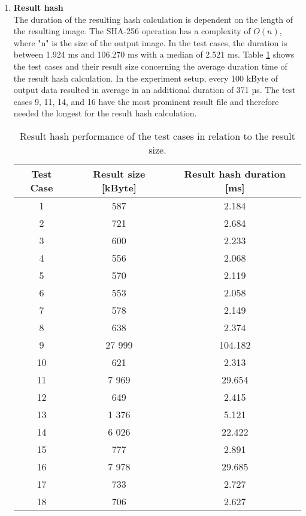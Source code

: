 \documentclass[draft,final]{vutinfth} %
\begin{document}
\begin{enumerate}
	\item \textbf{Result hash} \\
	The duration of the resulting hash calculation is dependent on the length of the resulting image. The SHA-256 operation has a complexity of $O(n)$, where "n" is the size of the output image. In the test cases, the duration is between 1.924 ms and 106.270 ms with a median of 2.521 ms. Table \ref{Tab:result_hash} shows the test cases and their result size concerning the average duration time of the result hash calculation. In the experiment setup, every 100 kByte of output data resulted in average in an additional duration of 371 µs. The test cases 9, 11, 14, and 16 have the most prominent result file and therefore needed the longest for the result hash calculation.     
	
	\begin{table}[]
		\centering
		\caption{Result hash performance of the test cases in relation to the result size.}
		\begin{tabular}{c|c|c}
			\textbf{Test Case} & \textbf{Result size [kByte]} & \textbf{Result hash duration [ms]}  \\ \hline
			1 & 587  & 2.184 \\ \hline 
			2 & 721 & 2.684 \\ \hline
			3 & 600 & 2.233 \\ \hline
			4 & 556 & 2.068 \\ \hline
			5 & 570 & 2.119 \\ \hline
			6 & 553 & 2.058 \\ \hline
			7 & 578 & 2.149 \\ \hline
			8 & 638 & 2.374 \\ \hline
			9 & 27 999 & 104.182 \\ \hline
			10 & 621 & 2.313 \\ \hline
			11 & 7 969 & 29.654 \\ \hline
			12 & 649 & 2.415 \\ \hline
			13 & 1 376 & 5.121 \\ \hline
			14 & 6 026 & 22.422 \\ \hline
			15 & 777 & 2.891 \\ \hline
			16 & 7 978 & 29.685 \\ \hline
			17 & 733 & 2.727 \\ \hline
			18 & 706 & 2.627 \\ 
		\end{tabular}
		\label{Tab:result_hash}
	\end{table}


\end{enumerate}
\end{document}

